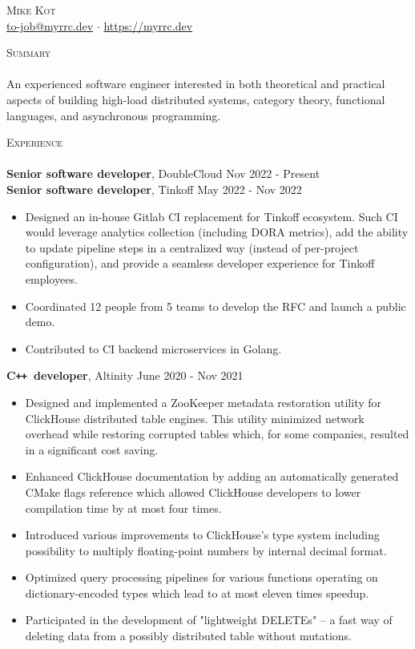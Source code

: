 \documentclass[a4paper]{article}
\newcommand{\lineunder} { \vspace*{-8pt} \\ \hspace*{-18pt} \hrulefill \\ }
\newcommand{\header} [1] { {\hspace*{-18pt}\vspace*{6pt} \textsc{#1}} \vspace*{-6pt} \lineunder }
\newcommand{\CC}{C\texttt{++}}
\begin{document}
\begin{center}
	{\Huge \scshape {Mike Kot}} \\
    \href{mailto:to-job@myrrc.dev}{to-job@myrrc.dev} $\cdot$
    \url{https://myrrc.dev} \\
\end{center}

\header{Summary}

An experienced software engineer interested in both theoretical and practical aspects of building
high-load distributed systems, category theory, functional languages, and asynchronous programming.

\header{Experience}

\textbf{Senior software developer}, DoubleCloud \hfill Nov 2022 - Present \\
\textbf{Senior software developer}, Tinkoff \hfill May 2022 - Nov 2022 \\

\begin{itemize}
    \item Designed an in-house Gitlab CI replacement for Tinkoff ecosystem.
        Such CI would leverage analytics collection (including DORA metrics),
        add the ability to update pipeline steps in a centralized way (instead of per-project configuration),
        and provide a seamless developer experience for Tinkoff employees.
    \item Coordinated 12 people from 5 teams to develop the RFC and launch a public demo.
    \item Contributed to CI backend microservices in Golang.
\end{itemize}

\textbf{\CC\ developer}, Altinity \hfill June 2020 - Nov 2021 \\

\begin{itemize}
    \item Designed and implemented a ZooKeeper metadata restoration utility for ClickHouse
        distributed table engines. This utility minimized network overhead while restoring
        corrupted tables which, for some companies, resulted in a significant cost saving.
    \item Enhanced ClickHouse documentation by adding an automatically generated CMake flags
        reference which allowed ClickHouse developers to lower compilation time by at most
        four times.
    \item Introduced various improvements to ClickHouse's type system including possibility to
        multiply floating-point numbers by internal decimal format.
    \item Optimized query processing pipelines for various functions operating on dictionary-encoded
        types which lead to at most eleven times speedup.
    \item Participated in the development of "lightweight DELETEs" -- a fast way of deleting
        data from a possibly distributed table without mutations.
\end{itemize}
\end{document}
